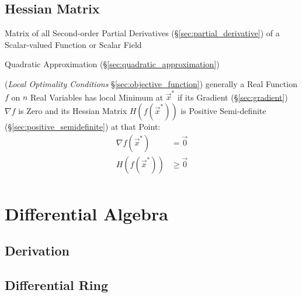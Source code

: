 \subsection{Hessian Matrix}\label{sec:hessian_matrix}


Matrix of all Second-order Partial Derivatives (\S\ref{sec:partial_derivative})
of a Scalar-valued Function or Scalar Field

\fist Quadratic Approximation (\S\ref{sec:quadratic_approximation})

(\emph{Local Optimality Conditions} \S\ref{sec:objective_function}) generally a
Real Function $f$ on $n$ Real Variables has local Minimum at $\vec{x}^*$ if its
Gradient (\S\ref{sec:gradient}) $\nabla f$ is Zero and its Hessian Matrix
$H(f(\vec{x}^*))$ is Positive Semi-definite (\S\ref{sec:positive_semidefinite})
at that Point:
\begin{align*}
  \nabla f(\vec{x}^*) & = \vec{0}    \\
  H(f(\vec{x}^*))     & \geq \vec{0} \\
\end{align*}



\section{Differential Algebra}\label{sec:differential_algebra}

\subsection{Derivation}\label{sec:derivation}

\subsection{Differential Ring}\label{sec:differential_ring}

